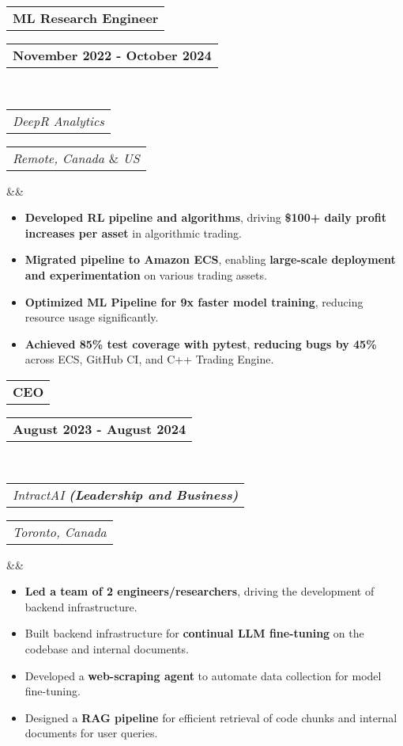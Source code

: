 \documentclass[11pt,a4paper,roman,colorlinks,linkcolor=blue,filecolor=magenta,urlcolor=cyan]{moderncv}        %
\makeatletter
\newcommand*{\customcventry}[7][.25em]{
  \begin{tabular}{@{}l} 
    {\bfseries #4}
  \end{tabular}
  \hfill%
  \begin{tabular}{l@{}}
     {\bfseries #5}
  \end{tabular} \\
  \begin{tabular}{@{}l} 
    {\itshape #3}
  \end{tabular}
  \hfill%
  \begin{tabular}{l@{}}
     {\itshape #2}
  \end{tabular}
  \ifx&#7&%
  \else{\\%
    \begin{minipage}{\maincolumnwidth}%
      \small#7%
    \end{minipage}}\fi%
  \par\addvspace{#1}}
\makeatother
\begin{document}
{\customcventry{Remote, Canada $\&$ US}{DeepR Analytics}{ML Research Engineer}{November 2022 - October 2024}{}{}
}
\begin{itemize}
\item \textbf{Developed RL pipeline and algorithms}, driving \textbf{\$100+ daily profit increases per asset} in algorithmic trading.
    \item \textbf{Migrated pipeline to Amazon ECS}, enabling \textbf{large-scale deployment and experimentation} on various trading assets.
    \item \textbf{Optimized ML Pipeline for 9x faster model training}, reducing resource usage significantly.
    \item  \textbf{Achieved 85\% test coverage with pytest}, \textbf{reducing bugs by 45\%} across ECS, GitHub CI, and C++ Trading Engine.

\end{itemize}

{\customcventry{Toronto, Canada}{IntractAI \textbf{(Leadership and Business)}}{CEO}{August 2023 - August 2024}{}{}
}
\begin{itemize}
    \item \textbf{Led a team of 2 engineers/researchers}, driving the development of backend infrastructure.
    \item Built backend infrastructure for \textbf{continual LLM fine-tuning} on the codebase and internal documents.  
    \item Developed a \textbf{web-scraping agent} to automate data collection for model fine-tuning.  
    \item Designed a \textbf{RAG pipeline} for efficient retrieval of code chunks and internal documents for user queries.  
\end{itemize}
\end{document}
